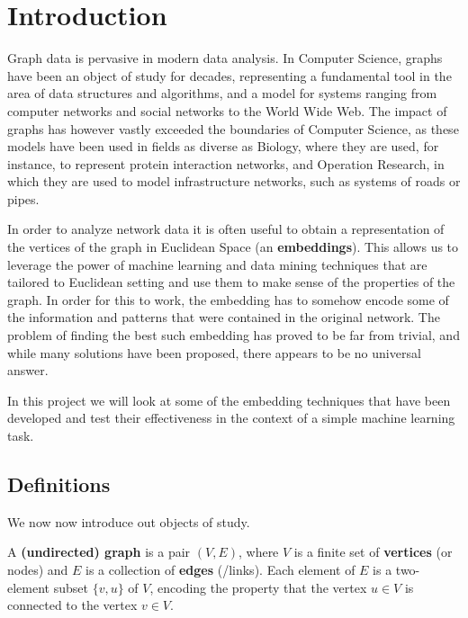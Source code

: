 \section{Introduction}
Graph data is pervasive in modern data analysis. In Computer Science, graphs have been an object of study for decades, representing a fundamental tool in the area of data structures and algorithms, and a model for systems ranging from computer networks and social networks to the World Wide Web. The impact of graphs has however vastly exceeded the boundaries of Computer Science, as these models have been used in fields as diverse as Biology, where they are used, for instance, to represent protein interaction networks, and Operation Research, in which they are used to model infrastructure networks, such as systems of roads or pipes.

In order to analyze network data it is often useful to obtain a representation of the vertices of the graph in Euclidean Space (an \textbf{embeddings}). This allows us to leverage the power of machine learning and data mining techniques that are tailored to Euclidean setting and use them to make sense of the properties of the graph. In order for this to work, the embedding has to somehow encode some of the information and patterns that were contained in the original network. The problem of finding the best such embedding has proved to be far from trivial, and while many solutions have been proposed, there appears to be no universal answer.

In this project we will look at some of the embedding techniques that have been developed and test their effectiveness in the context of a simple machine learning task.


\subsection*{Definitions}
We now now introduce out objects of study.

A \textbf{(undirected) graph} is a pair $(V,E)$, where $V$ is a finite set of \textbf{vertices} (or nodes) and $E$ is a collection of \textbf{edges} (/links). Each element of $E$ is a two-element subset $\{v,u\}$ of $V$, encoding the property that the vertex $u \in V$ is connected to the vertex $v \in V$.
